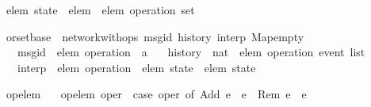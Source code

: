 \begin{isabellebody}
\isamarkupfalse%
\ {\isacharprime}elem\ state\ {\isacharequal}\ {\isachardoublequoteopen}{\isacharprime}elem\ {\isasymrightharpoonup}\ {\isacharprime}elem\ operation\ set{\isachardoublequoteclose}\isanewline
\end{isabellebody}

\begin{isabellebody}
\isamarkupfalse%
\ orset{\isacharunderscore}base\ {\isacharequal}\ network{\isacharunderscore}with{\isacharunderscore}ops\ msg{\isacharunderscore}id\ history\ interp\ {\isachardoublequoteopen}Map{\isachardot}empty{\isachardoublequoteclose}\isanewline
\ \ \ msg{\isacharunderscore}id\ {\isacharcolon}{\isacharcolon}\ {\isachardoublequoteopen}{\isacharprime}elem\ operation\ {\isasymRightarrow}\ {\isacharprime}a{\isachardoublequoteclose}\isanewline
\ \ \ history\ {\isacharcolon}{\isacharcolon}\ {\isachardoublequoteopen}nat\ {\isasymRightarrow}\ {\isacharprime}elem\ operation\ event\ list{\isachardoublequoteclose}\isanewline
\ \ \ interp\ {\isacharcolon}{\isacharcolon}\ {\isachardoublequoteopen}{\isacharprime}elem\ operation\ {\isasymRightarrow}\ {\isacharprime}elem\ state\ {\isasymrightharpoonup}\ {\isacharprime}elem\ state{\isachardoublequoteclose}\isanewline
\end{isabellebody}

\begin{isabellebody}
\isamarkupfalse%
\ op{\isacharunderscore}elem\ \isanewline
\ \ {\isachardoublequoteopen}op{\isacharunderscore}elem\ oper\ {\isasymequiv}\ case\ oper\ of\ Add\ e\ {\isasymRightarrow}\ e\ {\isacharbar}\ Rem\ e\ {\isasymRightarrow}\ e{\isachardoublequoteclose}\isanewline
\end{isabellebody}

